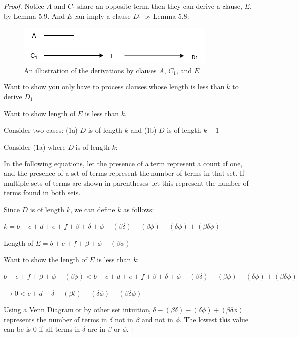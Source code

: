 \documentclass[manuscript]{acmart}
\begin{document}
\begin{proof}
        Notice $A$ and $C_1$ share an opposite term, then they can derive
        a clause, $E$, by Lemma 5.9. And $E$ can imply a clause $D_1$ by Lemma 5.8:

        \begin{figure}[h]
            \includegraphics[scale=0.8]{318b.png}
            \caption{An illustration of the derivations by clauses $A$, $C_1$, and $E$}
        \end{figure}

        Want to show you only have to process clauses whose length is
        less than $k$ to derive $D_1$.

        Want to show length of $E$ is less than $k$.

        Consider two cases: (1a) $D$ is of length $k$ and 
        (1b) $D$ is of length $k - 1$
        
        Consider (1a) where $D$ is of length $k$:

        In the following equations, let the presence of a term represent a count of one,
        and the presence of a set of terms represent the number of terms in that set. If
        multiple sets of terms are shown in parentheses, let this represent the number
        of terms found in both sets.

        Since $D$ is of length $k$, we can define $k$ as follows:

        $k = b + c + d + e + f + \beta + \delta + \phi - (\beta \delta) 
        - (\beta \phi) - (\delta \phi) + (\beta \delta \phi)$

        Length of $E = b + e + f + \beta + \phi - (\beta \phi)$
        
        Want to show the length of $E$ is less than $k$:

        $b + e + f + \beta + \phi - (\beta \phi) < b + c + d + e + f + 
        \beta + \delta + \phi - (\beta \delta) - (\beta \phi) - (\delta \phi) 
        + (\beta \delta \phi)$

        $\rightarrow 0 < c + d + \delta - (\beta \delta) 
        - (\delta \phi) + (\beta \delta \phi)$

        Using a Venn Diagram or by other set intuition, $\delta - 
        (\beta \delta) - (\delta \phi) + (\beta \delta \phi)$ represents
        the number of terms in $\delta$ not in $\beta$ and not in $\phi$. 
        The lowest this value can be is 0 if all terms in $\delta$ are in 
        $\beta$ or $\phi$.


\end{proof}
\end{document}

